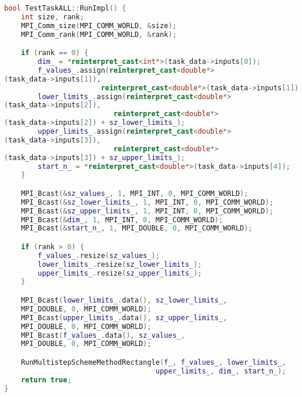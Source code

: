 \documentclass[14pt,a4paper]{article}
\begin{document}
\begin{framed}
\begin{lstlisting}[language=C++]
bool TestTaskALL::RunImpl() {
    int size, rank;
    MPI_Comm_size(MPI_COMM_WORLD, &size);
    MPI_Comm_rank(MPI_COMM_WORLD, &rank);

    if (rank == 0) {
        dim_ = *reinterpret_cast<int*>(task_data->inputs[0]);
        f_values_.assign(reinterpret_cast<double*>
(task_data->inputs[1]),
                       reinterpret_cast<double*>(task_data->inputs[1]) + sz_values_);
        lower_limits_.assign(reinterpret_cast<double*>
(task_data->inputs[2]),
                          reinterpret_cast<double*>
(task_data->inputs[2]) + sz_lower_limits_);
        upper_limits_.assign(reinterpret_cast<double*>
(task_data->inputs[3]),
                          reinterpret_cast<double*>
(task_data->inputs[3]) + sz_upper_limits_);
        start_n_ = *reinterpret_cast<double*>(task_data->inputs[4]);
    }

    MPI_Bcast(&sz_values_, 1, MPI_INT, 0, MPI_COMM_WORLD);
    MPI_Bcast(&sz_lower_limits_, 1, MPI_INT, 0, MPI_COMM_WORLD);
    MPI_Bcast(&sz_upper_limits_, 1, MPI_INT, 0, MPI_COMM_WORLD);
    MPI_Bcast(&dim_, 1, MPI_INT, 0, MPI_COMM_WORLD);
    MPI_Bcast(&start_n_, 1, MPI_DOUBLE, 0, MPI_COMM_WORLD);

    if (rank > 0) {
        f_values_.resize(sz_values_);
        lower_limits_.resize(sz_lower_limits_);
        upper_limits_.resize(sz_upper_limits_);
    }

    MPI_Bcast(lower_limits_.data(), sz_lower_limits_,
    MPI_DOUBLE, 0, MPI_COMM_WORLD);
    MPI_Bcast(upper_limits_.data(), sz_upper_limits_, 
    MPI_DOUBLE, 0, MPI_COMM_WORLD);
    MPI_Bcast(f_values_.data(), sz_values_, 
    MPI_DOUBLE, 0, MPI_COMM_WORLD);

    RunMultistepSchemeMethodRectangle(f_, f_values_, lower_limits_,
                                    upper_limits_, dim_, start_n_);
    return true;
}
\end{lstlisting}
\end{framed}
\end{document}
